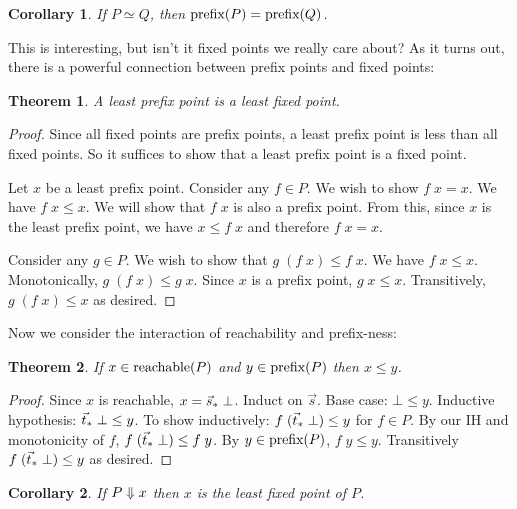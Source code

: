 \documentclass{article}
\newcommand{\todo}[1]{{\color{red}{#1}}}
\newtheorem{theorem}{Theorem}
\newtheorem{corollary}{Corollary}
\begin{document}
\todo{Maybe the ordering on programs is the opposite of what it should be?}

\begin{corollary}
  If $P \simeq Q$, then $\text{prefix}(P) = \text{prefix}(Q)$.
  \label{cor:simeq->prefix}
\end{corollary}

This is interesting, but isn't it fixed points we really care about? As it turns
out, there is a powerful connection between prefix points and fixed points:

\begin{theorem}
  A least prefix point is a least fixed point.
\end{theorem}

\begin{proof}
  Since all fixed points are prefix points, a least prefix point is less than
  all fixed points. So it suffices to show that a least prefix point is a fixed
  point.

  Let $x$ be a least prefix point. Consider any $f \in P$. We wish to show $f\;x
  = x$. We have $f\; x \le x$. We will show that $f\;x$ is also a prefix point.
  From this, since $x$ is the least prefix point, we have $x \le f\;x$ and
  therefore $f\;x = x$.

  Consider any $g \in P$. We wish to show that $g\;(f\;x) \le f\; x$. We have
  $f\;x \le x$. Monotonically, $g\;(f\;x) \le g\;x$. Since $x$ is a prefix
  point, $g\;x \le x$. Transitively, $g\;(f\;x) \le x$ as desired.
\end{proof}

Now we consider the interaction of reachability and prefix-ness:

\begin{theorem}
  If $x \in \text{reachable}(P)$ and $y \in \text{prefix}(P)$ then $x \le y$.
  \label{thm:reachable<=prefix}
\end{theorem}

\begin{proof}
  Since $x$ is reachable, $x = {\vec{s}_*}\; \bot$. Induct on $\vec{s}$. Base case:
  $\bot \le y$. Inductive hypothesis: ${\vec{t}_*}\; \bot \le y$. To show
  inductively: $f\; ({\vec{t}_*}\; \bot) \le y$ for $f \in P$. By our IH and
  monotonicity of $f$, $f\;({\vec{t}_*}\; \bot) \le f\; y$. By $y \in \text{prefix}(P)$,
  $f\;y \le y$. Transitively $f\; ({\vec{t}_*}\; \bot) \le y$ as desired.
\end{proof}

\begin{corollary}
  If $P \Downarrow x$ then $x$ is the least fixed point of $P$.
\end{corollary}
\end{document}
